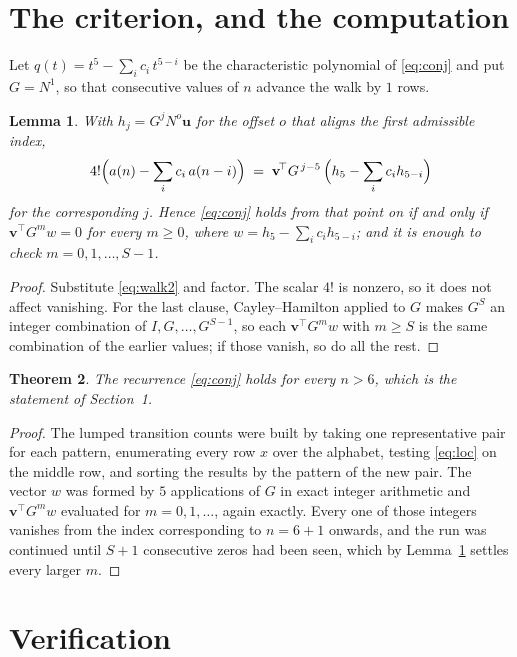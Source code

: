 \documentclass[11pt,a4paper]{article}
\theoremstyle{plain}
\newtheorem{theorem}{Theorem}
\newtheorem{lemma}[theorem]{Lemma}
\theoremstyle{definition}
\begin{document}
\section{The criterion, and the computation}

Let $q(t)=t^{5}-\sum_i c_i\,t^{5-i}$ be the characteristic polynomial of
\eqref{eq:conj} and put $G=N^{1}$, so that consecutive values of $n$ advance the
walk by $1$ rows.

\begin{lemma}\label{lem:crit}
With $h_j=G^{j}N^{o}\mathbf{u}$ for the offset $o$ that aligns the first admissible
index,
\[
4!\Bigl(a(n)-\sum_i c_i\,a(n-i)\Bigr)\;=\;\mathbf{v}^{\!\top}G^{\,j-5}\,
\Bigl(h_{5}-\sum_i c_i h_{5-i}\Bigr)
\]
for the corresponding $j$. Hence \eqref{eq:conj} holds from that point on if and only if
$\mathbf{v}^{\!\top}G^{m}w=0$ for every $m\ge0$, where
$w=h_{5}-\sum_i c_ih_{5-i}$; and it is enough to check $m=0,1,\dots,S-1$.
\end{lemma}

\begin{proof}
Substitute \eqref{eq:walk2} and factor. The scalar $4!$ is nonzero, so it does not
affect vanishing. For the last clause, Cayley--Hamilton applied to $G$ makes $G^{S}$ an
integer combination of $I,G,\dots,G^{S-1}$, so each $\mathbf{v}^{\!\top}G^{m}w$ with
$m\ge S$ is the same combination of the earlier values; if those vanish, so do all the rest.
\end{proof}

\begin{theorem}
The recurrence \eqref{eq:conj} holds for every $n>6$, which is the statement of
Section~1.
\end{theorem}

\begin{proof}
The lumped transition counts were built by taking one representative pair for each pattern,
enumerating every row $x$ over the alphabet, testing \eqref{eq:loc} on the middle
row, and sorting the results by the pattern of the new pair. The vector $w$ was formed by
$5$ applications of $G$ in exact integer arithmetic and $\mathbf{v}^{\!\top}G^{m}w$
evaluated for $m=0,1,\dots$, again exactly. Every one of those integers vanishes from the
index corresponding to $n=6+1$ onwards, and the run was continued until $S+1$
consecutive zeros had been seen, which by Lemma~\ref{lem:crit} settles every larger $m$.
\end{proof}

\section{Verification}
\end{document}
